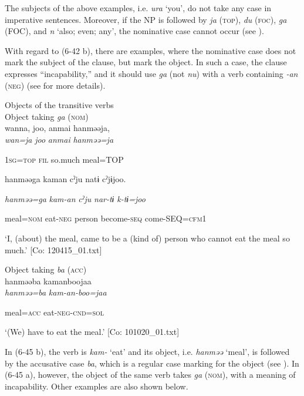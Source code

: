 The subjects of the above examples, i.e. \textit{ura} ‘you’, do not take any case in imperative sentences. Moreover, if the NP is followed by \textit{ja} (\textsc{top}), \textit{du} (\textsc{foc}), \textit{ga} (FOC), and \textit{n} ‘also; even; any’, the nominative case cannot occur (see ).

  With regard to (6-42 b), there are examples, where the nominative case does not mark the subject of the clause, but mark the object. In such a case, the clause expresses “incapability,” and it should use \textit{ga} (not \textit{nu}) with a verb containing \textit{{}-an} (\textsc{neg}) (see  for more details).

\ea\label{ex:6-45}
 Objects of the transitive verbs\\

 \ea Object taking \textit{ga} (\textsc{nom})\\
{\TM}
\gll  wanna,  joo,  anmai  hanməəja,\\

      \textit{wan=ja}  \textit{joo}  \textit{anmai}  \textit{hanməə=ja}

      1\textsc{sg}=\textsc{top}  \textsc{fil}  so.much  meal=TOP

      hanməəga  kaman  cˀju  natɨ  cˀjɨjoo.

      \textit{hanməə=ga}  \textit{kam-an}  \textit{cˀju}  \textit{nar-tɨ}  \textit{k-tɨ=joo}

      meal=\textsc{nom}  eat-\textsc{neg}  person  become-\textsc{seq}  come-SEQ=\textsc{cfm}1

\glt ‘I, (about) the meal, came to be a (kind of) person who cannot eat the meal so much.’ [Co: 120415\_01.txt]
\z

 \ex Object taking \textit{ba} (\textsc{acc})\\
{\TM}
\gll  hanməəba  kamanboojaa\\

      \textit{hanməə=ba}  \textit{kam-an-boo=jaa}

      meal=\textsc{acc}  eat-\textsc{neg}-\textsc{cnd}=\textsc{sol}

\glt ‘(We) have to eat the meal.’ [Co: 101020\_01.txt]
\z

In (6-45 b), the verb is \textit{kam-} ‘eat’ and its object, i.e. \textit{hanməə} ‘meal’, is followed by the accusative case \textit{ba}, which is a regular case marking for the object (see ). In (6-45 a), however, the object of the same verb takes \textit{ga} (\textsc{nom}), with a meaning of incapability. Other examples are also shown below.


